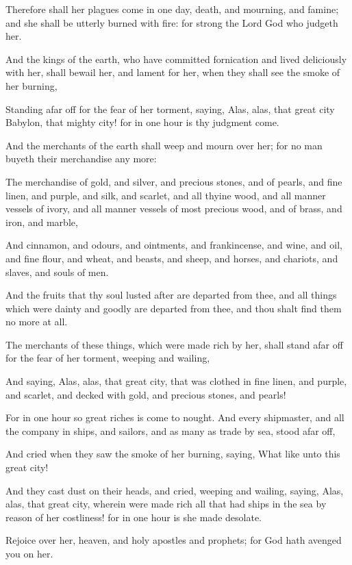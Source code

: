 {Therefore
shall
her
plagues
come
in
one
day,
death,
and
mourning,
and
famine;
and she shall be utterly
burned
with
fire:
for
strong
{} the
Lord
God who
judgeth
her.

And the
kings of the
earth,
who have committed
fornication
and lived
deliciously
with
her, shall
bewail
her,
and
lament
for
her,
when they shall
see the
smoke of
her
burning,

Standing
afar
off
for the
fear of
her
torment,
saying,
Alas,
alas,
that
great
city
Babylon, that
mighty
city!
for
in
one
hour is
thy
judgment
come.

And the
merchants of the
earth shall
weep
and
mourn
over
her;
for no
man
buyeth
their
merchandise any
more:

The
merchandise of
gold,
and
silver,
and
precious
stones,
and of
pearls,
and fine
linen,
and
purple,
and
silk,
and
scarlet,
and
all
thyine
wood,
and all
manner
vessels of
ivory,
and all
manner
vessels
of most
precious
wood,
and of
brass,
and
iron,
and
marble,

And
cinnamon,
and
odours,
and
ointments,
and
frankincense,
and
wine,
and
oil,
and fine
flour,
and
wheat,
and
beasts,
and
sheep,
and
horses,
and
chariots,
and
slaves,
and
souls of
men.

And the
fruits
that
thy
soul lusted
after are
departed
from
thee,
and all
things which were
dainty
and
goodly are
departed
from
thee,
and thou shalt
find
them no
more at
all.

The
merchants of these
things,
which were made
rich
by
her, shall
stand
afar
off
for the
fear of
her
torment,
weeping
and
wailing,

And
saying,
Alas,
alas, that
great
city, that was
clothed in fine
linen,
and
purple,
and
scarlet,
and
decked
with
gold,
and
precious
stones,
and
pearls!

For in
one
hour so
great
riches is come to
nought.
And
every
shipmaster,
and
all the
company
in
ships,
and
sailors,
and as many
as trade
by
sea,
stood
afar
off,

And
cried when they
saw the
smoke of
her
burning,
saying,
What
{} like
unto this
great
city!

And they
cast
dust
on
their
heads,
and
cried,
weeping
and
wailing,
saying,
Alas,
alas,
that
great
city,
wherein were made
rich
all that
had
ships
in the
sea by reason
of
her
costliness!
for in
one
hour is she made
desolate.

Rejoice
over
her,
{}
heaven,
and
{}
holy
apostles
and
prophets;
for
God
hath
avenged
you
on
her.

}
